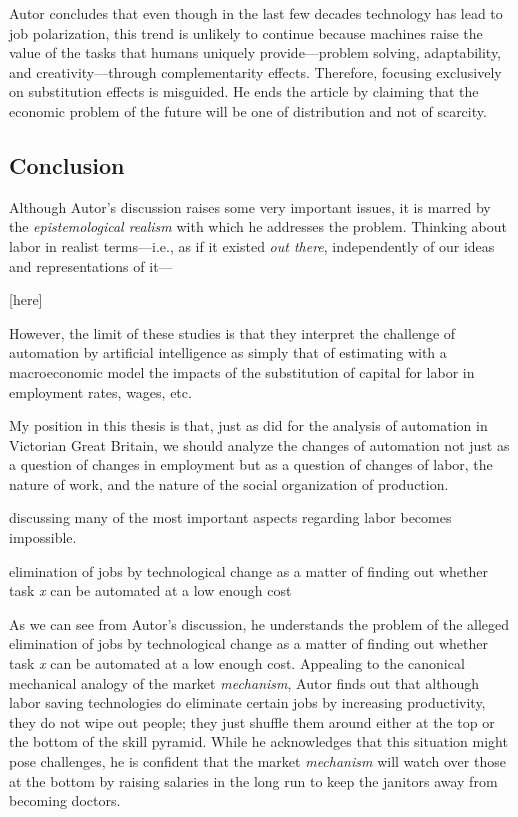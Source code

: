 \documentclass[version=last,draft=false,paper=A4,portrait,twoside=true,twocolumn=false,headinclude=false,footinclude=false,mpinclude=true,fontsize=12,BCOR=20mm,DIV=calc,pagesize=auto,open=right,chapterprefix=true,numbers=autoendperiod,headsepline=false,headings=twolinechapter,parskip=false]{scrbook}
\begin{document}
Autor concludes that even though in the last few decades technology has
lead to job polarization, this trend is unlikely to continue because
machines raise the value of the tasks that humans uniquely
provide---problem solving, adaptability, and creativity---through
complementarity effects. Therefore, focusing exclusively on substitution
effects is misguided. He ends the article by claiming that the economic
problem of the future will be one of distribution and not of scarcity.
\subsection{Conclusion}
\label{sec:org8410237}
Although Autor's discussion raises some very important issues, it is marred
by the \emph{epistemological realism} with which he addresses the problem.
Thinking about labor in realist terms---i.e., as if it existed \emph{out there},
independently of our ideas and representations of it---

[here]

However, the limit of these studies is that they interpret the challenge of
automation by artificial intelligence as simply that of estimating with a
macroeconomic model the impacts of the substitution of capital for labor in
employment rates, wages, etc. 

My position in this thesis is that, just as \textcite{schaffer1994} did for
the analysis of automation in Victorian Great Britain, we should analyze
the changes of automation not just as a question of changes in employment
but as a question of changes of labor, the nature of work, and the nature
of the social organization of production. 





discussing many of the most important aspects regarding labor
becomes impossible.

elimination of jobs by technological change as a matter of finding
out whether task \emph{x} can be automated at a low enough cost


As we can see from Autor's discussion, he understands the problem of the
alleged elimination of jobs by technological change as a matter of finding
out whether task \emph{x} can be automated at a low enough cost. Appealing to the
canonical mechanical analogy of the market \emph{mechanism}, Autor finds out that
although labor saving technologies do eliminate certain jobs by increasing
productivity, they do not wipe out people; they just shuffle them around
either at the top or the bottom of the skill pyramid. While he acknowledges
that this situation might pose challenges, he is confident that the market
\emph{mechanism} will watch over those at the bottom by raising salaries in the
long run to keep the janitors away from becoming doctors. 
\end{document}
